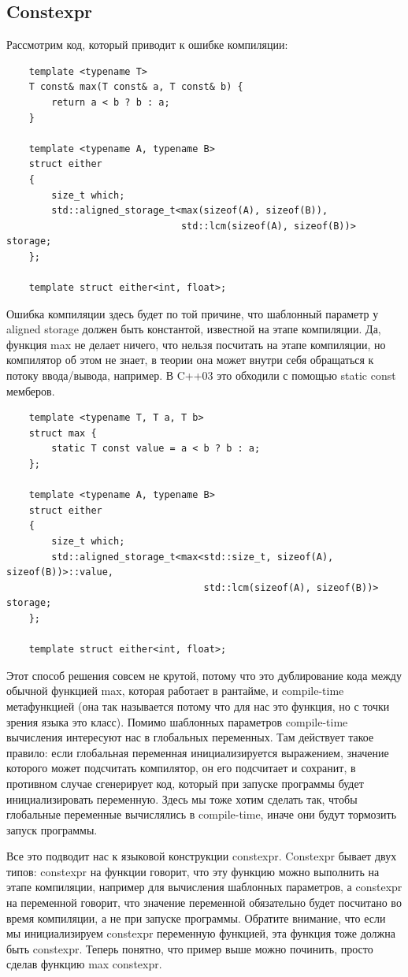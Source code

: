 \documentclass[12pt, a4paper]{article}
\begin{document}
\subsection{Constexpr}
\par Рассмотрим код, который приводит к ошибке компиляции:
\begin{verbatim}
	template <typename T>
	T const& max(T const& a, T const& b) {
		return a < b ? b : a;
	}
	
	template <typename A, typename B>
	struct either
	{
		size_t which;
		std::aligned_storage_t<max(sizeof(A), sizeof(B)),
							   std::lcm(sizeof(A), sizeof(B))> storage;
	};
	
	template struct either<int, float>;
\end{verbatim}
Ошибка компиляции здесь будет по той причине, что шаблонный параметр у aligned storage должен быть константой, известной на этапе компиляции. Да, функция max не делает ничего, что нельзя посчитать на этапе компиляции, но компилятор об этом не знает, в теории она может внутри себя обращаться к потоку ввода/вывода, например. В C++03 это обходили с помощью static const мемберов.
\begin{verbatim}
	template <typename T, T a, T b>
	struct max {
		static T const value = a < b ? b : a;
	};
	
	template <typename A, typename B>
	struct either
	{
		size_t which;
		std::aligned_storage_t<max<std::size_t, sizeof(A), sizeof(B))>::value,
							       std::lcm(sizeof(A), sizeof(B))> storage;
	};
	
	template struct either<int, float>;
\end{verbatim}
Этот способ решения совсем не крутой, потому что это дублирование кода между обычной функцией max, которая работает в рантайме, и compile-time метафункцией (она так называется потому что для нас это функция, но с точки зрения языка это класс). Помимо шаблонных параметров compile-time вычисления интересуют нас в глобальных переменных. Там действует такое правило: если глобальная переменная инициализируется выражением, значение которого может подсчитать компилятор, он его подсчитает и сохранит, в противном случае сгенерирует код, который при запуске программы будет инициализировать переменную. Здесь мы тоже хотим сделать так, чтобы глобальные переменные вычислялись в compile-time, иначе они будут тормозить запуск программы.
\par Все это подводит нас к языковой конструкции constexpr. Constexpr бывает двух типов: constexpr на функции говорит, что эту функцию можно выполнить на этапе компиляции, например для вычисления шаблонных параметров, а constexpr на переменной говорит, что значение переменной обязательно будет посчитано во время компиляции, а не при запуске программы. Обратите внимание, что если мы инициализируем constexpr переменную функцией, эта функция тоже должна быть constexpr. Теперь понятно, что пример выше можно починить, просто сделав функцию max constexpr.
\end{document}
